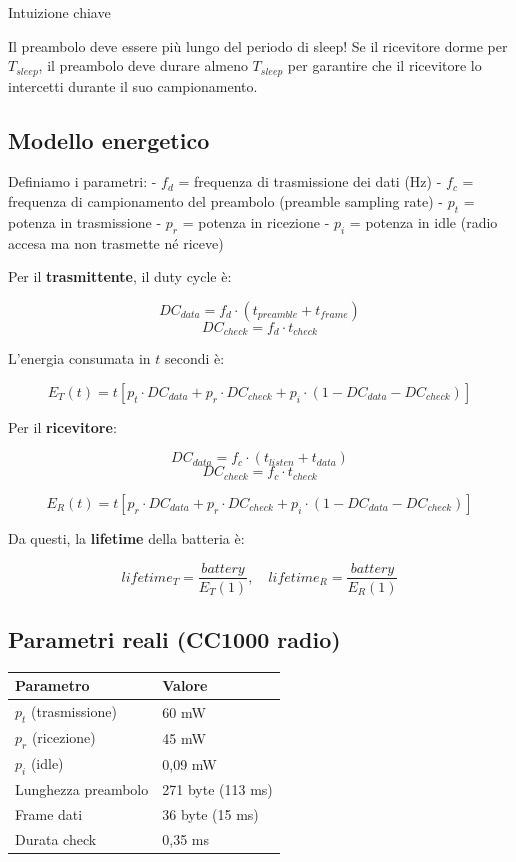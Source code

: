 \documentclass[
  italian,
  openany]{book}
\newcounter{none} %
\begin{document}
\begin{callouttip}{Intuizione chiave}

Il preambolo deve essere più lungo del periodo di sleep! Se il
ricevitore dorme per \(T_{sleep}\), il preambolo deve durare almeno
\(T_{sleep}\) per garantire che il ricevitore lo intercetti durante il
suo campionamento.

\end{callouttip}

\subsection{Modello energetico}\label{modello-energetico}

Definiamo i parametri: - \(f_d\) = frequenza di trasmissione dei dati
(Hz) - \(f_c\) = frequenza di campionamento del preambolo (preamble
sampling rate) - \(p_t\) = potenza in trasmissione - \(p_r\) = potenza
in ricezione - \(p_i\) = potenza in idle (radio accesa ma non trasmette
né riceve)

Per il \textbf{trasmittente}, il duty cycle è:

\[DC_{data} = f_d \cdot (t_{preamble} + t_{frame})\]
\[DC_{check} = f_d \cdot t_{check}\]

L'energia consumata in \(t\) secondi è:

\[E_T(t) = t \left[ p_t \cdot DC_{data} + p_r \cdot DC_{check} + p_i \cdot (1 - DC_{data} - DC_{check}) \right]\]

Per il \textbf{ricevitore}:

\[DC_{data} = f_c \cdot (t_{listen} + t_{data})\]
\[DC_{check} = f_c \cdot t_{check}\]

\[E_R(t) = t \left[ p_r \cdot DC_{data} + p_r \cdot DC_{check} + p_i \cdot (1 - DC_{data} - DC_{check}) \right]\]

Da questi, la \textbf{lifetime} della batteria è:

\[lifetime_T = \frac{battery}{E_T(1)}, \quad lifetime_R = \frac{battery}{E_R(1)}\]

\subsection{Parametri reali (CC1000
radio)}\label{parametri-reali-cc1000-radio}

{\def\LTcaptype{none} %
\begin{longtable}[]{@{}ll@{}}
\toprule\noalign{}
Parametro & Valore \\
\midrule\noalign{}
\endhead
\bottomrule\noalign{}
\endlastfoot
\(p_t\) (trasmissione) & 60 mW \\
\(p_r\) (ricezione) & 45 mW \\
\(p_i\) (idle) & 0,09 mW \\
Lunghezza preambolo & 271 byte (113 ms) \\
Frame dati & 36 byte (15 ms) \\
Durata check & 0,35 ms \\
\end{longtable}
}
\end{document}
